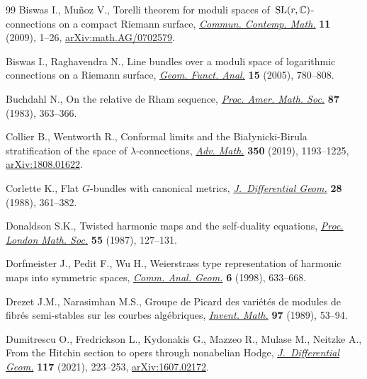 \documentclass[pdftex]{sigma}
\numberwithin{equation}{section}
\theoremstyle{definition}
\begin{document}
\begin{thebibliography}{99}
Biswas I., Mu\~noz V., Torelli theorem for moduli spaces of~{${\rm
 SL}(r,\mathbb C)$}-connections on a compact {R}iemann surface,
 \href{https://doi.org/10.1142/S0219199709003260}{\textit{Commun. Contemp.
 Math.}} \textbf{11} (2009), 1--26,
 \href{http://arxiv.org/abs/math.AG/0702579}{arXiv:math.AG/0702579}.

Biswas I., Raghavendra N., Line bundles over a moduli space of logarithmic
 connections on a {R}iemann surface,
 \href{https://doi.org/10.1007/s00039-005-0523-x}{\textit{Geom. Funct. Anal.}}
 \textbf{15} (2005), 780--808.

Buchdahl N., On the relative de {R}ham sequence,
 \href{https://doi.org/10.2307/2043718}{\textit{Proc. Amer. Math. Soc.}}
 \textbf{87} (1983), 363--366.

Collier B., Wentworth R., Conformal limits and the {B}ia{\l}ynicki-{B}irula
 stratification of the space of {$\lambda$}-connections,
 \href{https://doi.org/10.1016/j.aim.2019.04.034}{\textit{Adv. Math.}}
 \textbf{350} (2019), 1193--1225,
 \href{http://arxiv.org/abs/1808.01622}{arXiv:1808.01622}.

Corlette K., Flat {$G$}-bundles with canonical metrics,
 \href{https://doi.org/10.4310/jdg/1214442469}{\textit{J.~Differential Geom.}}
 \textbf{28} (1988), 361--382.

Donaldson S.K., Twisted harmonic maps and the self-duality equations,
 \href{https://doi.org/10.1112/plms/s3-55.1.127}{\textit{Proc. London Math.
 Soc.}} \textbf{55} (1987), 127--131.

Dorfmeister J., Pedit F., Wu H., Weierstrass type representation of harmonic
 maps into symmetric spaces,
 \href{https://doi.org/10.4310/CAG.1998.v6.n4.a1}{\textit{Comm. Anal. Geom.}}
 \textbf{6} (1998), 633--668.

Drezet J.M., Narasimhan M.S., Groupe de {P}icard des vari\'et\'es de modules de
 fibr\'es semi-stables sur les courbes alg\'ebriques,
 \href{https://doi.org/10.1007/BF01850655}{\textit{Invent. Math.}} \textbf{97}
 (1989), 53--94.

Dumitrescu O., Fredrickson L., Kydonakis G., Mazzeo R., Mulase M., Neitzke A.,
 From the {H}itchin section to opers through nonabelian {H}odge,
 \href{https://doi.org/10.4310/jdg/1612975016}{\textit{J.~Differential Geom.}}
 \textbf{117} (2021), 223--253,
 \href{http://arxiv.org/abs/1607.02172}{arXiv:1607.02172}.


\end{thebibliography}
\end{document}

